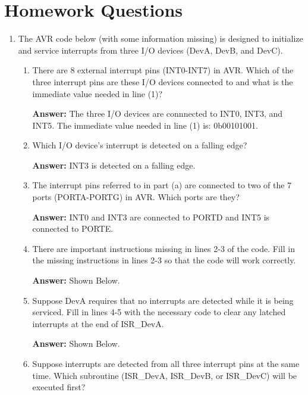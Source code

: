 \documentclass[12pt,letterpaper]{article}
\begin{document}
\section{Homework Questions}
	\begin{enumerate}
	    \item
		The AVR code below (with some information missing) is designed to initialize and service interrupts from three I/O devices (DevA, DevB, and DevC). 
	
		\begin{enumerate}[a]
			\item
			There are 8 external interrupt pins (INT0-INT7) in AVR. 
			Which of the three interrupt pins are these I/O devices connected to and what is the immediate value needed in line (1)?
			
			\textbf{Answer:}
			The three I/O devices are connnected to INT0, INT3, and INT5.
			The immediate value needed in line (1) is: 0b00101001.
			
			
			\item
			Which I/O device’s interrupt is detected on a falling edge?
			
			\textbf{Answer:}
			INT3 is detected on a falling edge.
			
			
			\item
			The interrupt pins referred to in part (a) are connected to two of the 7 ports (PORTA-PORTG) in AVR.
			Which ports are they?
			
			\textbf{Answer:}
			INT0 and INT3 are connected to PORTD and INT5 is connected to PORTE.
			
			
			\item
			There are important instructions missing in lines 2-3 of the code. 
			Fill in the missing instructions in lines 2-3 so that the code will work correctly.
			
			\textbf{Answer:} Shown Below.
			
			\item 
			Suppose DevA requires that no interrupts are detected while it is being serviced. 
			Fill in lines 4-5 with the necessary code to clear any latched interrupts at the end of ISR\_DevA.
			
			\textbf{Answer:} Shown Below.
			
			
			\item
			Suppose interrupts are detected from all three interrupt pins at the same time. 
			Which subroutine (ISR\_DevA, ISR\_DevB, or ISR\_DevC) will be executed first? 
			

\end{enumerate}
\end{enumerate}
\end{document}
